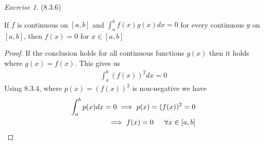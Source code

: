 \documentclass[12pt,oneside]{amsart}
\theoremstyle{definition}
\theoremstyle{remark}
\newtheorem{exer}{Exercise}
\numberwithin{equation}{exer}
\begin{document}
\newpage



\begin{exer} (8.3.6)

If $f$ is continuous on $[a,b]$ and $\int_a^bf(x)g(x)dx=0$ for every continuous  $g$ on $[a,b]$, then $f(x)=0$ for $x\in[a,b]$

\end{exer}

\begin{proof}
If the conclusion holds for all continuous functions $g(x)$ then it holds where $g(x) = f(x)$. This gives us
\begin{align*}
    \int_a^b(f(x))^2dx = 0
\end{align*}
Using 8.3.4, where $p(x) = (f(x))^2$ is non-negative we have
\begin{align*}
    \int_a^bp(x)dx = 0 \implies p(x)=(f(x))^2=0\\
    \implies f(x) =0\indent\forall x \in [a,b]
\end{align*}
\end{proof}
\end{document}
